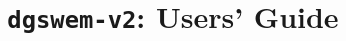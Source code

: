 \documentclass[10pt,letterpaper]{report}
\begin{document}
\title{ \texttt{dgswem-v2}: Users' Guide}

\maketitle
\tableofcontents












\end{document}
